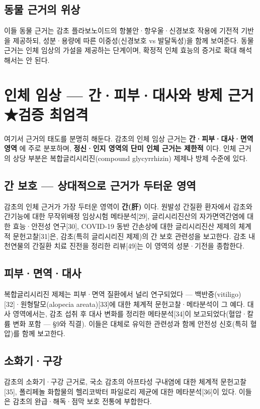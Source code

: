 \documentclass[11pt,oneside]{book}
\begin{document}
\subsection{동물 근거의 위상}
이들 동물 근거는 감초 플라보노이드의 항불안·항우울·신경보호 작용에 기전적 기반을 제공하되, 성분·용량에 따른 이중성(신경보호 vs 발달독성)을 함께 보여준다. 동물 근거는 인체 임상의 가설을 제공하는 단계이며, 확정적 인체 효능의 증거로 확대 해석해서는 안 된다.

\section{인체 임상 — 간·피부·대사와 방제 근거 ★검증 최엄격}
여기서 근거의 태도를 분명히 해둔다. 감초의 인체 임상 근거는 \textbf{간·피부·대사·면역 영역} 에 주로 분포하며, \textbf{정신·인지 영역의 단미 인체 근거는 제한적} 이다. 인체 근거의 상당 부분은 복합글리시리진(compound glycyrrhizin) 제제나 방제 수준에 있다.

\subsection{간 보호 — 상대적으로 근거가 두터운 영역}
감초의 인체 근거가 가장 두터운 영역이 \textbf{간(肝)} 이다. 원발성 간질환 환자에서 감초와 간기능에 대한 무작위배정 임상시험 메타분석[29], 글리시리진산의 자가면역간염에 대한 효능·안전성 연구[30], COVID-19 동반 간손상에 대한 글리시리진산 제제의 체계적 문헌고찰[31]은, 감초(특히 글리시리진 제제)의 간 보호 관련성을 보고한다. 감초 내 천연물의 간질환 치료 진전을 정리한 리뷰[49]는 이 영역의 성분·기전을 종합한다.

\subsection{피부·면역·대사}
복합글리시리진 제제는 피부·면역 질환에서 널리 연구되었다 — 백반증(vitiligo)[32]·원형탈모(alopecia areata)[33]에 대한 체계적 문헌고찰·메타분석이 그 예다. 대사 영역에서는, 감초 섭취 후 대사 변화를 정리한 메타분석[34]이 보고되었다(혈압·칼륨 변화 포함 — §9와 직결). 이들은 대체로 유익한 관련성과 함께 안전성 신호(특히 혈압)를 함께 보고한다.

\subsection{소화기·구강}
감초의 소화기·구강 근거로, 국소 감초의 아프타성 구내염에 대한 체계적 문헌고찰[35], 폴리페놀 화합물의 헬리코박터 파일로리 제균에 대한 메타분석[36]이 있다. 이들은 감초의 완급·해독·점막 보호 전통에 부합한다.
\end{document}
